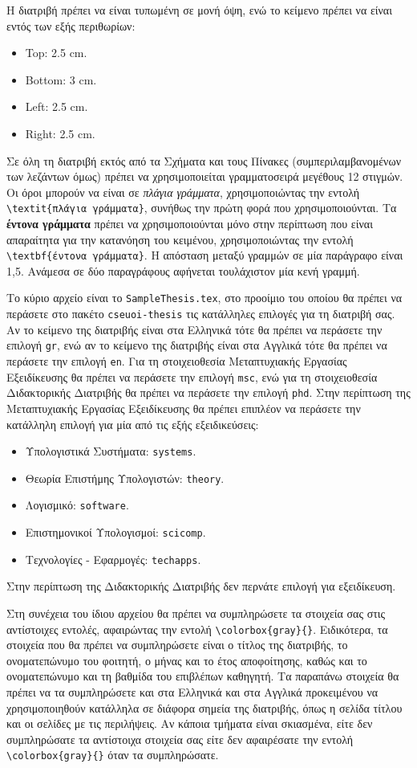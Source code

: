 Η διατριβή πρέπει να είναι τυπωμένη σε μονή όψη, ενώ το κείμενο πρέπει να είναι εντός των εξής περιθωρίων:
\begin{itemize}
	\item Top: 2.5 cm.
	\item Bottom: 3 cm.
	\item Left: 2.5 cm.
	\item Right: 2.5 cm.
\end{itemize}
Σε όλη τη διατριβή εκτός από τα Σχήματα και τους Πίνακες (συμπεριλαμβανομένων των λεζάντων όμως) πρέπει να χρησιμοποιείται γραμματοσειρά μεγέθους 12 στιγμών.
Οι όροι μπορούν να είναι σε \textit{πλάγια γράμματα}, χρησιμοποιώντας την εντολή \verb|\textit{πλάγια γράμματα}|, συνήθως την πρώτη φορά που χρησιμοποιούνται.
Τα \textbf{έντονα γράμματα} πρέπει να χρησιμοποιούνται μόνο στην περίπτωση που είναι απαραίτητα για την κατανόηση του κειμένου, χρησιμοποιώντας την εντολή \verb|\textbf{έντονα γράμματα}|.
{\color{red}Η απόσταση μεταξύ γραμμών σε μία παράγραφο είναι 1,5.
Ανάμεσα σε δύο παραγράφους αφήνεται τουλάχιστον μία κενή γραμμή.}

Το κύριο αρχείο είναι το \texttt{SampleThesis.tex}, στο προοίμιο του οποίου θα πρέπει να περάσετε στο πακέτο \texttt{cseuoi-thesis} τις κατάλληλες επιλογές για τη διατριβή σας.
Αν το κείμενο της διατριβής είναι στα Ελληνικά τότε θα πρέπει να περάσετε την επιλογή \texttt{gr}, ενώ αν το κείμενο της διατριβής είναι στα Αγγλικά τότε θα πρέπει να περάσετε την επιλογή \texttt{en}.
Για τη στοιχειοθεσία Μεταπτυχιακής Εργασίας Εξειδίκευσης θα πρέπει να περάσετε την επιλογή \texttt{msc}, ενώ για τη στοιχειοθεσία Διδακτορικής Διατριβής θα πρέπει να περάσετε την επιλογή \texttt{phd}.
Στην περίπτωση της Μεταπτυχιακής Εργασίας Εξειδίκευσης θα πρέπει επιπλέον να περάσετε την κατάλληλη επιλογή για μία από τις εξής εξειδικεύσεις:
\begin{itemize}
	\item Υπολογιστικά Συστήματα: \texttt{systems}.
	\item Θεωρία Επιστήμης Υπολογιστών: \texttt{theory}.
	\item Λογισμικό: \texttt{software}.
	\item Επιστημονικοί Υπολογισμοί: \texttt{scicomp}.
	\item Τεχνολογίες - Εφαρμογές: \texttt{techapps}.
\end{itemize}
Στην περίπτωση της Διδακτορικής Διατριβής δεν περνάτε επιλογή για εξειδίκευση.

Στη συνέχεια του ίδιου αρχείου θα πρέπει να συμπληρώσετε τα στοιχεία σας στις αντίστοιχες εντολές, αφαιρώντας την εντολή \verb|\colorbox{gray}{}|.
Ειδικότερα, τα στοιχεία που θα πρέπει να συμπληρώσετε είναι ο τίτλος της διατριβής, το ονοματεπώνυμο του φοιτητή, ο μήνας και το έτος αποφοίτησης, καθώς και το ονοματεπώνυμο και τη βαθμίδα του επιβλέπων καθηγητή.
Τα παραπάνω στοιχεία θα πρέπει να τα συμπληρώσετε και στα Ελληνικά και στα Αγγλικά προκειμένου να χρησιμοποιηθούν κατάλληλα σε διάφορα σημεία της διατριβής, όπως η σελίδα τίτλου και οι σελίδες με τις περιλήψεις.
Αν κάποια τμήματα είναι σκιασμένα, είτε δεν συμπληρώσατε τα αντίστοιχα στοιχεία σας είτε δεν αφαιρέσατε την εντολή \verb|\colorbox{gray}{}| όταν τα συμπληρώσατε.

